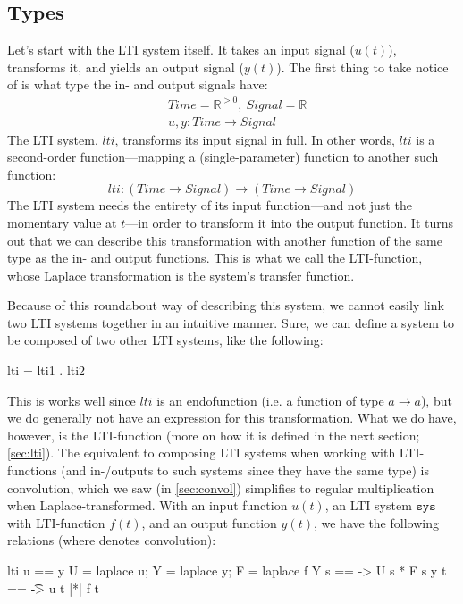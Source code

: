\subsection{Types}\label{sec:tftypes}
Let's start with the LTI system itself. It takes an input signal ($u(t)$), transforms it, and yields an output signal ($y(t)$). The first thing to take notice of is what type the in- and output signals have:
\begin{align*}
    &Time = \mathbb{R}^{>0},~ Signal = \mathbb{R} \\
    &u, y : Time \rightarrow Signal
\end{align*}
The LTI system, $lti$, transforms its input signal in full. In other words, $lti$ is a second-order function---mapping a (single-parameter) function to another such function:
\begin{equation*}
    lti : (Time \rightarrow Signal) \rightarrow (Time \rightarrow Signal)
\end{equation*}
The LTI system needs the entirety of its input function---and not just the momentary value at $t$---in order to transform it into the output function.
It turns out that we can describe this transformation with another function of the same type as the in- and output functions. This is what we call the LTI-function, whose Laplace transformation is the system's transfer function.

Because of this roundabout way of describing this system, we cannot easily link two LTI systems together in an intuitive manner. Sure, we can define a system to be composed of two other LTI systems, like the following: 
\begin{codeeq}
lti = lti1 . lti2
\end{codeeq}
This is works well since $lti$ is an endofunction (i.e. a function of type $a\rightarrow a$), but we do generally not have an expression for this transformation. What we do have, however, is the LTI-function (more on how it is defined in the next section; \ref{sec:lti}). The equivalent to composing LTI systems when working with LTI-functions (and in-/outputs to such systems since they have the same type) is convolution, which we saw (in \ref{sec:convol}) simplifies to regular multiplication when Laplace-transformed.
With an input function $u(t)$, an LTI system $\texttt{sys}$ with LTI-function $f(t)$, and an output function $y(t)$, we have the following relations (where \cmd{|*|} denotes convolution):
\begin{codeeq}
lti u == y
U = laplace u; Y = laplace y; F = laplace f
Y s == \s -> U s * F s
y t == \t -> u t |*| f t
\end{codeeq}

